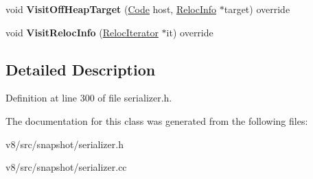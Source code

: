 \begin{DoxyCompactItemize}
\item 
\mbox{\label{classv8_1_1internal_1_1Serializer_1_1ObjectSerializer_a55cb24a3bd0b38a0bacba7613b0214e7}} 
void {\bfseries Visit\+Off\+Heap\+Target} (\mbox{\hyperlink{classv8_1_1internal_1_1Code}{Code}} host, \mbox{\hyperlink{classv8_1_1internal_1_1RelocInfo}{Reloc\+Info}} $\ast$target) override
\item 
\mbox{\label{classv8_1_1internal_1_1Serializer_1_1ObjectSerializer_a6c9c20b1f3c5f689ff9004b5511dc516}} 
void {\bfseries Visit\+Reloc\+Info} (\mbox{\hyperlink{classv8_1_1internal_1_1RelocIterator}{Reloc\+Iterator}} $\ast$it) override
\end{DoxyCompactItemize}


\subsection{Detailed Description}


Definition at line 300 of file serializer.\+h.



The documentation for this class was generated from the following files\+:\begin{DoxyCompactItemize}
\item 
v8/src/snapshot/serializer.\+h\item 
v8/src/snapshot/serializer.\+cc\end{DoxyCompactItemize}
